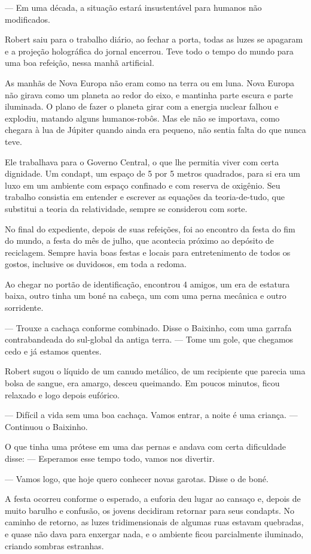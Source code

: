 \documentclass[a4paper,14pt]{book}
\begin{document}
— Em uma década, a situação estará insustentável para humanos não modificados.

Robert saiu para o trabalho diário, ao fechar a porta, todas as luzes se apagaram e a projeção holográfica do jornal encerrou. Teve todo o tempo do mundo para uma boa refeição, nessa manhã artificial.

As manhãs de Nova Europa não eram como na terra ou em luna. Nova Europa não girava como um planeta ao redor do eixo, e mantinha parte escura e parte iluminada. O plano de fazer o planeta girar com a energia nuclear falhou e explodiu, matando alguns humanos-robôs. Mas ele não se importava, como chegara à lua de Júpiter quando ainda era pequeno, não sentia falta do que nunca teve.

Ele trabalhava para o Governo Central, o que lhe permitia viver com certa dignidade. Um condapt, um espaço de 5 por 5 metros quadrados, para si era um luxo em um ambiente com espaço confinado e com reserva de oxigênio. Seu trabalho consistia em entender e escrever as equações da teoria-de-tudo, que substitui a teoria da relatividade, sempre se considerou com sorte.

No final do expediente, depois de suas refeições, foi ao encontro da festa do fim do mundo, a festa do mês de julho, que acontecia próximo ao depósito de reciclagem. Sempre havia boas festas e locais para entretenimento de todos os gostos, inclusive os duvidosos, em toda a redoma.

Ao chegar no portão de identificação, encontrou 4 amigos, um era de estatura baixa, outro tinha um boné na cabeça, um com uma perna mecânica e outro sorridente.

— Trouxe a cachaça conforme combinado. Disse o Baixinho, com uma garrafa contrabandeada do sul-global da antiga terra. — Tome um gole, que chegamos cedo e já estamos quentes.

Robert sugou o líquido de um canudo metálico, de um recipiente que parecia uma bolsa de sangue, era amargo, desceu queimando. Em poucos minutos, ficou relaxado e logo depois eufórico.

— Difícil a vida sem uma boa cachaça. Vamos entrar, a noite é uma criança. — Continuou o Baixinho.

O que tinha uma prótese em uma das pernas e andava com certa dificuldade disse: — Esperamos esse tempo todo, vamos nos divertir.

— Vamos logo, que hoje quero conhecer novas garotas. Disse o de boné.

A festa ocorreu conforme o esperado, a euforia deu lugar ao cansaço e, depois de muito barulho e confusão, os jovens decidiram retornar para seus condapts. No caminho de retorno, as luzes tridimensionais de algumas ruas estavam quebradas, e quase não dava para enxergar nada, e o ambiente ficou parcialmente iluminado, criando sombras estranhas.
\end{document}
